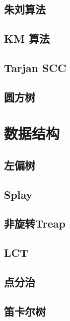 \documentclass[a4paper,12pt]{article}
\begin{document}
\subsection{朱刘算法}

\subsection{KM 算法}

\subsection{Tarjan SCC}

\subsection{圆方树}


\section{数据结构}

\subsection{左偏树}

\subsection{Splay}

\subsection{非旋转Treap}

\subsection{LCT}


\subsection{点分治}

\subsection{笛卡尔树}

\end{document}
